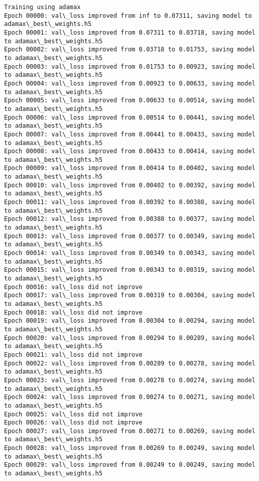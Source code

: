 \documentclass[11pt]{article}
\begin{document}
\begin{Verbatim}[commandchars=\\\{\}]
Training using adamax
Epoch 00000: val\_loss improved from inf to 0.07311, saving model to adamax\_best\_weights.h5
Epoch 00001: val\_loss improved from 0.07311 to 0.03718, saving model to adamax\_best\_weights.h5
Epoch 00002: val\_loss improved from 0.03718 to 0.01753, saving model to adamax\_best\_weights.h5
Epoch 00003: val\_loss improved from 0.01753 to 0.00923, saving model to adamax\_best\_weights.h5
Epoch 00004: val\_loss improved from 0.00923 to 0.00633, saving model to adamax\_best\_weights.h5
Epoch 00005: val\_loss improved from 0.00633 to 0.00514, saving model to adamax\_best\_weights.h5
Epoch 00006: val\_loss improved from 0.00514 to 0.00441, saving model to adamax\_best\_weights.h5
Epoch 00007: val\_loss improved from 0.00441 to 0.00433, saving model to adamax\_best\_weights.h5
Epoch 00008: val\_loss improved from 0.00433 to 0.00414, saving model to adamax\_best\_weights.h5
Epoch 00009: val\_loss improved from 0.00414 to 0.00402, saving model to adamax\_best\_weights.h5
Epoch 00010: val\_loss improved from 0.00402 to 0.00392, saving model to adamax\_best\_weights.h5
Epoch 00011: val\_loss improved from 0.00392 to 0.00388, saving model to adamax\_best\_weights.h5
Epoch 00012: val\_loss improved from 0.00388 to 0.00377, saving model to adamax\_best\_weights.h5
Epoch 00013: val\_loss improved from 0.00377 to 0.00349, saving model to adamax\_best\_weights.h5
Epoch 00014: val\_loss improved from 0.00349 to 0.00343, saving model to adamax\_best\_weights.h5
Epoch 00015: val\_loss improved from 0.00343 to 0.00319, saving model to adamax\_best\_weights.h5
Epoch 00016: val\_loss did not improve
Epoch 00017: val\_loss improved from 0.00319 to 0.00304, saving model to adamax\_best\_weights.h5
Epoch 00018: val\_loss did not improve
Epoch 00019: val\_loss improved from 0.00304 to 0.00294, saving model to adamax\_best\_weights.h5
Epoch 00020: val\_loss improved from 0.00294 to 0.00289, saving model to adamax\_best\_weights.h5
Epoch 00021: val\_loss did not improve
Epoch 00022: val\_loss improved from 0.00289 to 0.00278, saving model to adamax\_best\_weights.h5
Epoch 00023: val\_loss improved from 0.00278 to 0.00274, saving model to adamax\_best\_weights.h5
Epoch 00024: val\_loss improved from 0.00274 to 0.00271, saving model to adamax\_best\_weights.h5
Epoch 00025: val\_loss did not improve
Epoch 00026: val\_loss did not improve
Epoch 00027: val\_loss improved from 0.00271 to 0.00269, saving model to adamax\_best\_weights.h5
Epoch 00028: val\_loss improved from 0.00269 to 0.00249, saving model to adamax\_best\_weights.h5
Epoch 00029: val\_loss improved from 0.00249 to 0.00249, saving model to adamax\_best\_weights.h5

\end{Verbatim}
\end{document}
